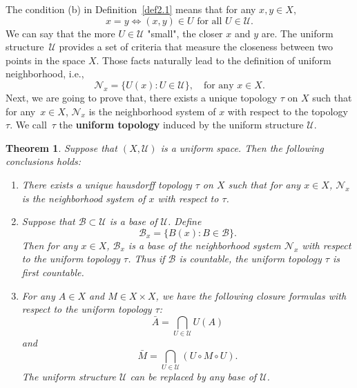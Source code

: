\documentclass[12pt,a4paper,draft]{article}  %
\newtheorem{theorem}{Theorem}[section]
\theoremstyle{definition}
\numberwithin{equation}{section}
\begin{document}
The condition (b) in Definition~\eqref{def2.1} means that for any $x,y \in X$,
\[
x=y \iff (x,y) \in U \text{ for all } U \in \mathcal{U}.
\]
We can say that the more $U \in \mathcal{U}$ "small", the closer $x$ and $y$ are.
The uniform structure~$\mathcal{U}$ provides a set of criteria that measure the closeness between two points in the space $X$.
Those facts naturally lead to the definition of uniform neighborhood, i.e.,
\[
    \mathcal{N}_x = \{U(x): U \in \mathcal{U}\}, \quad \text{for any } x \in X.
\]
Next, we are going to prove that, there exists a unique topology $\tau$ on $X$
such that for any~$x \in X$, $\mathcal{N}_x$ is the neighborhood system of $x$ with respect to the topology $\tau$.
We call~$\tau$ the \textbf{uniform topology} induced by the uniform structure $\mathcal{U}$.
\begin{theorem} \label{thm2.1}
    Suppose that $(X,\mathcal{U})$ is a uniform space. Then the following conclusions holds:
    \begin{enumerate}
        \item There exists a unique hausdorff topology $\tau$ on $X$ such that for any $x \in X$,
            $\mathcal{N}_x$ is the neighborhood system of $x$ with respect to $\tau$.
        \item Suppose that $\mathcal{B} \subset \mathcal{U}$ is a base of $\mathcal{U}$. Define
            $$ \mathcal{B}_x = \{B(x): B \in \mathcal{B}\}. $$
            Then for any $x \in X$, $\mathcal{B}_x$ is a base of the neighborhood system $\mathcal{N}_x$ with respect to the uniform topology $\tau$.
            Thus if $\mathcal{B}$ is countable, the uniform topology $\tau$ is first countable.
        \item For any $A \in X$ and $M \in X \times X$, we have the following closure formulas with respect to the uniform topology $\tau$:
            $$ \bar{A}=\bigcap_{U \in \mathcal{U}} U(A) $$
            and 
            $$ \bar{M} = \bigcap_{U \in \mathcal{U}} (U \circ M \circ U). $$
            The uniform structure $\mathcal{U}$ can be replaced by any base of $\mathcal{U}$.
    \end{enumerate}
\end{theorem}
\end{document}
